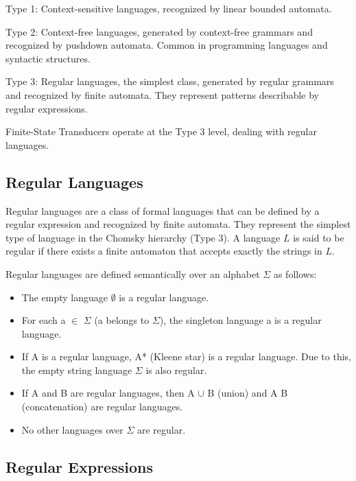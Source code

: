     Type 1: Context-sensitive languages, recognized by linear bounded automata.

    Type 2: Context-free languages, generated by context-free grammars and recognized by pushdown automata. Common in programming languages and syntactic structures.

    Type 3: Regular languages, the simplest class, generated by regular grammars and recognized by finite automata. They represent patterns describable by regular expressions.

Finite-State Transducers operate at the Type 3 level, dealing with regular languages.

\subsection{Regular Languages}

Regular languages are a class of formal languages that can be defined by a regular expression and recognized by finite automata. 
They represent the simplest type of language in the Chomsky hierarchy (Type 3). 
A language \( L \) is said to be regular if there exists a finite automaton that accepts exactly the strings in \( L \).

Regular languages are defined semantically over an alphabet \( \Sigma \) as follows:
\begin{itemize}
    \item The empty language \(\emptyset\) is a regular language.
    \item For each a \( \in \) \( \Sigma \) (a belongs to \( \Sigma \)), the singleton language {a} is a regular language.
    \item If A is a regular language, A* (Kleene star) is a regular language. Due to this, the empty string language {\( \Sigma \)} is also regular.
    \item If A and B are regular languages, then A \(\cup\) B (union) and A B (concatenation) are regular languages.
    \item No other languages over \( \Sigma \) are regular.
\end{itemize}

\subsection{Regular Expressions}

